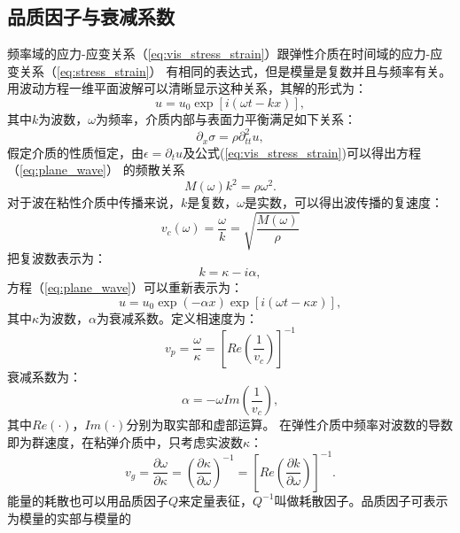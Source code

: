 \subsection{品质因子与衰减系数}
\vspace{0.2cm}
频率域的应力-应变关系（\ref{eq:vis_stress_strain}）跟弹性介质在时间域的应力-应变关系（\ref{eq:stress_strain}）
有相同的表达式，但是模量是复数并且与频率有关。用波动方程一维平面波解可以清晰显示这种关系，其解的形式为：
\begin{equation}
	u=u_0\exp[i(\omega t-kx)],
	\label{eq:plane_wave}
\end{equation}
其中$k$为波数，$\omega$为频率，介质内部与表面力平衡满足如下关系：
\begin{equation}
	\partial_x\sigma=\rho\partial^2_{tt}u,
\end{equation}
假定介质的性质恒定，由$\epsilon=\partial_t u$及公式(\ref{eq:vis_stress_strain})可以得出方程（\ref{eq:plane_wave}）
的频散关系
\begin{equation}
	M(\omega)k^2=\rho\omega^2.
\end{equation}
对于波在粘性介质中传播来说，$k$是复数，$\omega$是实数，可以得出波传播的复速度：
\begin{equation}
	v_c(\omega)=\frac{\omega}{k}=\sqrt{\frac{M(\omega)}{\rho}}
	\label{eq:vc}
\end{equation}
把复波数表示为：
\begin{equation}
	k=\kappa -i\alpha,
\end{equation}
\newpage
方程（\ref{eq:plane_wave}）可以重新表示为：
\begin{equation}
	u=u_0\exp(-\alpha x)\exp[i(\omega t-\kappa x)],
\end{equation}
其中$\kappa$为波数，$\alpha$为衰减系数。定义相速度为：
\begin{equation}
	v_p=\frac{\omega}{\kappa}=[Re(\frac{1}{v_c})]^{-1}
	\label{eq:phase_velocity}
\end{equation}
衰减系数为：
\begin{equation}
	\alpha=-\omega Im(\frac{1}{v_c}),
	\label{eq:alpha}
\end{equation}
其中$Re(\cdot)$，$Im(\cdot)$分别为取实部和虚部运算。
在弹性介质中频率对波数的导数即为群速度，在粘弹介质中，只考虑实波数$\kappa$：
\begin{equation}
	v_g=\frac{\partial \omega}{\partial \kappa}=(\frac{\partial \kappa}{\partial \omega})^{-1}
	=[Re(\frac{\partial k}{\partial \omega})]^{-1}.
\end{equation}
能量的耗散也可以用品质因子$Q$来定量表征，$Q^{-1}$叫做耗散因子。品质因子可表示为模量的实部与模量的
